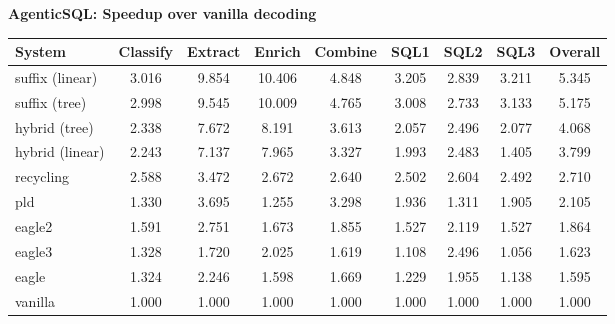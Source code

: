 \textbf{AgenticSQL: Speedup over vanilla decoding}
\begin{table}[H]
\begin{adjustbox}{width=\linewidth}
\centering
\begin{tabular}{lcccccccc}
\toprule
\textbf{System} & Classify & Extract & Enrich & Combine & SQL1 & SQL2 & SQL3 & \textbf{Overall} \\
\midrule
suffix (linear) & 3.016 & 9.854 & 10.406 & 4.848 & 3.205 & 2.839 & 3.211 & 5.345 \\
suffix (tree) & 2.998 & 9.545 & 10.009 & 4.765 & 3.008 & 2.733 & 3.133 & 5.175 \\
hybrid (tree) & 2.338 & 7.672 & 8.191 & 3.613 & 2.057 & 2.496 & 2.077 & 4.068 \\
hybrid (linear) & 2.243 & 7.137 & 7.965 & 3.327 & 1.993 & 2.483 & 1.405 & 3.799 \\
recycling & 2.588 & 3.472 & 2.672 & 2.640 & 2.502 & 2.604 & 2.492 & 2.710 \\
pld & 1.330 & 3.695 & 1.255 & 3.298 & 1.936 & 1.311 & 1.905 & 2.105 \\
eagle2 & 1.591 & 2.751 & 1.673 & 1.855 & 1.527 & 2.119 & 1.527 & 1.864 \\
eagle3 & 1.328 & 1.720 & 2.025 & 1.619 & 1.108 & 2.496 & 1.056 & 1.623 \\
eagle & 1.324 & 2.246 & 1.598 & 1.669 & 1.229 & 1.955 & 1.138 & 1.595 \\
vanilla & 1.000 & 1.000 & 1.000 & 1.000 & 1.000 & 1.000 & 1.000 & 1.000 \\
\bottomrule
\end{tabular}
\end{adjustbox}
\end{table}
